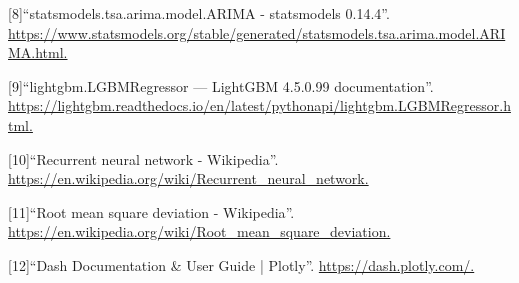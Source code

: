 \documentclass[10pt]{article}
\begin{document}
\label{csl:8}[8]``{statsmodels.tsa.arima.model.ARIMA - statsmodels 0.14.4}''. \url{https://www.statsmodels.org/stable/generated/statsmodels.tsa.arima.model.ARIMA.html.}

\label{csl:9}[9]``{lightgbm.LGBMRegressor — LightGBM 4.5.0.99 documentation}''. \url{https://lightgbm.readthedocs.io/en/latest/pythonapi/lightgbm.LGBMRegressor.html.}

\label{csl:10}[10]``{Recurrent neural network - Wikipedia}''. \url{https://en.wikipedia.org/wiki/Recurrent_neural_network.}

\label{csl:11}[11]``{Root mean square deviation - Wikipedia}''. \url{https://en.wikipedia.org/wiki/Root_mean_square_deviation.}

\label{csl:12}[12]``{Dash Documentation \& User Guide | Plotly}''. \url{https://dash.plotly.com/.}
\end{document}
